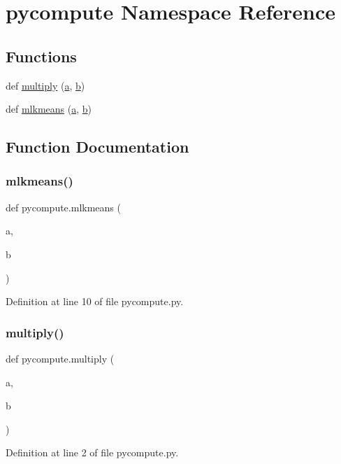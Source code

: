 \hypertarget{namespacepycompute}{}\section{pycompute Namespace Reference}
\label{namespacepycompute}
\subsection*{Functions}
\begin{DoxyCompactItemize}
\item 
def \mbox{\hyperlink{namespacepycompute_af7498e1653825e1a7a7a7d4a1e2701ac}{multiply}} (\mbox{\hyperlink{glad_8h_a3309789fc188587d666cda5ece79cf82}{a}}, \mbox{\hyperlink{glad_8h_a0f71581a41fd2264c8944126dabbd010}{b}})
\item 
def \mbox{\hyperlink{namespacepycompute_a9e38483f46fe7cb78b9168755e4a410d}{mlkmeans}} (\mbox{\hyperlink{glad_8h_a3309789fc188587d666cda5ece79cf82}{a}}, \mbox{\hyperlink{glad_8h_a0f71581a41fd2264c8944126dabbd010}{b}})
\end{DoxyCompactItemize}


\subsection{Function Documentation}
\mbox{\label{namespacepycompute_a9e38483f46fe7cb78b9168755e4a410d}} 
\subsubsection{\texorpdfstring{mlkmeans()}{mlkmeans()}}
{\footnotesize\ttfamily def pycompute.\+mlkmeans (\begin{DoxyParamCaption}\item[{}]{a,  }\item[{}]{b }\end{DoxyParamCaption})}



Definition at line 10 of file pycompute.\+py.

\mbox{\label{namespacepycompute_af7498e1653825e1a7a7a7d4a1e2701ac}} 
\subsubsection{\texorpdfstring{multiply()}{multiply()}}
{\footnotesize\ttfamily def pycompute.\+multiply (\begin{DoxyParamCaption}\item[{}]{a,  }\item[{}]{b }\end{DoxyParamCaption})}



Definition at line 2 of file pycompute.\+py.

